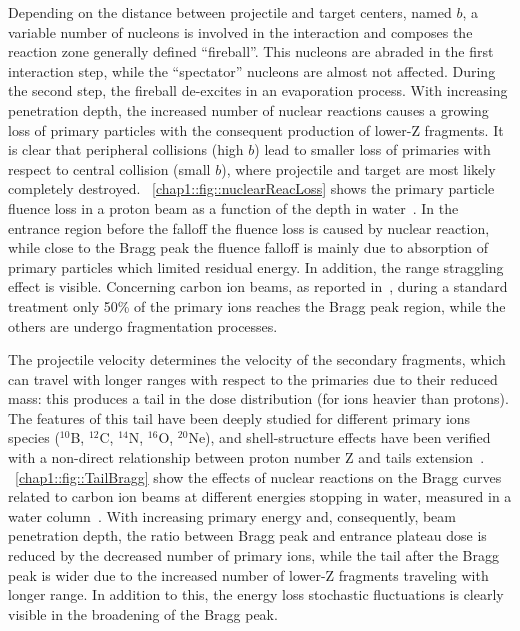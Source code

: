 Depending on the distance between projectile and target centers, named $b$, a variable number of nucleons is involved in the interaction and composes the reaction zone generally defined \enquote{fireball}. This nucleons are abraded in the first interaction step, while the \enquote{spectator} nucleons are almost not affected. During the second step, the fireball de-excites in an evaporation process. With increasing penetration depth, the increased number of nuclear reactions causes a growing loss of primary particles with the consequent production of lower-Z fragments. It is clear that peripheral collisions (high $b$) lead to smaller loss of primaries with respect to central collision (small $b$), where projectile and target are most likely completely destroyed. \figurename~\ref{chap1::fig::nuclearReacLoss} shows the primary particle fluence loss in a proton beam as a function of the depth in water~\parencite{Newhauser2015}. In the entrance region before the falloff the fluence loss is caused by nuclear reaction, while close to the Bragg peak the fluence falloff is mainly due to absorption of primary particles which limited residual energy. In addition, the range straggling effect is visible. Concerning carbon ion beams, as reported in~\cite{Durante2016}, during a standard treatment only 50\% of the primary ions reaches the Bragg peak region, while the others are undergo fragmentation processes.

The projectile velocity determines the velocity of the secondary fragments, which can travel with longer ranges with respect to the primaries due to their reduced mass: this produces a tail in the dose distribution (for ions heavier than protons). The features of this tail have been deeply studied for different primary ions species ($^{10}$B, $^{12}$C, $^{14}$N, $^{16}$O, $^{20}$Ne), and shell-structure effects have been verified with a non-direct relationship between proton number Z and tails extension~\parencite{Schall1996}.  \figurename~\ref{chap1::fig::TailBragg} show the effects of nuclear reactions on the Bragg curves related to carbon ion beams at different energies stopping in water, measured in a water column~\parencite{Schardt2008}.  With increasing primary energy and, consequently, beam penetration depth, the ratio between Bragg peak and entrance plateau dose is reduced by the decreased number of primary ions, while the tail after the Bragg peak is wider due to the increased number of lower-Z fragments traveling with longer range. In addition to this, the energy loss stochastic fluctuations is clearly visible in the broadening of the Bragg peak.  

